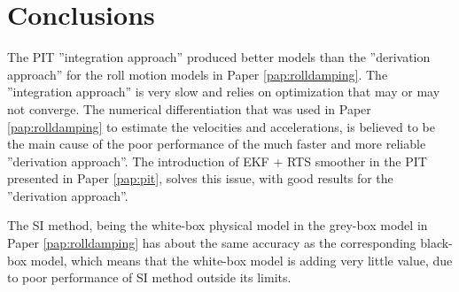 \chapter{Conclusions\label{ch:conclusions}}
The PIT ''integration approach'' produced better models than the ''derivation approach'' for the roll motion models in Paper \ref{pap:rolldamping}. The ''integration approach'' is very slow and relies on optimization that may or may not converge.
The numerical differentiation that was used in Paper \ref{pap:rolldamping} to estimate the velocities and accelerations, is believed to be the main cause of the poor performance of the much faster and more reliable ''derivation approach''. The introduction of EKF + RTS smoother in the PIT presented in Paper \ref{pap:pit}, solves this issue, with good results for the ''derivation approach''.

The SI method, being the white-box physical model in the grey-box model in Paper \ref{pap:rolldamping} has about the same accuracy as the corresponding black-box model, which means that the white-box model is adding very little value, due to poor performance of SI method outside its limits.

 

   